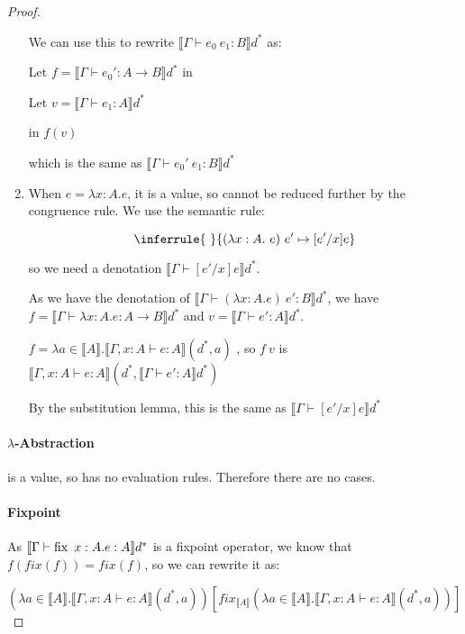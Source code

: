 \begin{proof}
\begin{enumerate}
{We can use this to rewrite $\llbracket \Gamma \vdash e_0 \ e_1 : B \rrbracket d^*$ as:

Let $f = \llbracket \Gamma \vdash e_0' : A \to B \rrbracket d^*$ in 

\hspace{4.5cm} Let $v = \llbracket \Gamma \vdash e_1 : A \rrbracket d^*$ 

\hspace{7cm} in $f(v)$

which is the same as $\llbracket \Gamma \vdash e_0' \ e_1 : B \rrbracket d^*$
}
\item{When $e = \lambda x:A.e$, it is a value, so cannot be reduced further by the congruence rule. We use the semantic rule:

$$
\inferrule{ \ }
 {(\lambda x: A .\ e) \ e' \mapsto [e'/x]e}
$$

so we need a denotation $\llbracket \Gamma \vdash [e'/x]e \rrbracket d^*$.

As we have the denotation of $\llbracket \Gamma \vdash (\lambda x:A. e) \ e' : B \rrbracket d^*$, we have $f = \llbracket \Gamma \vdash \lambda x:A. e : A \to B \rrbracket d^*$ and $v = \llbracket \Gamma \vdash e': A  \rrbracket d^*.$

$f = \lambda a \in \llbracket A \rrbracket . \llbracket \Gamma, x : A \vdash e : A \rrbracket(d^*, a)$ , so $f \ v$ is $\llbracket \Gamma, x : A \vdash e : A \rrbracket(d^*, \llbracket \Gamma \vdash e' : A \rrbracket d^*)$

By the substitution lemma, this is the same as $\llbracket \Gamma \vdash [e'/x]e \rrbracket d^*$}
\end{enumerate}

\paragraph{$\lambda$-Abstraction}  is a value, so has no evaluation rules. Therefore there are no cases.

\paragraph{Fixpoint} As $\llbracket \Gamma \vdash \operatorname{fix} \ x:A .e : A \rrbracket d^*$ is a fixpoint operator, we know that $f(fix(f)) = fix(f)$, so we can rewrite it as:

\[(\lambda a \in \llbracket A \rrbracket . \llbracket \Gamma, x : A \vdash e : A \rrbracket(d^*, a))[fix_{\llbracket A \rrbracket} (\lambda a \in \llbracket A \rrbracket . \llbracket \Gamma, x : A \vdash e : A \rrbracket(d^*, a))]\]


\end{proof}
